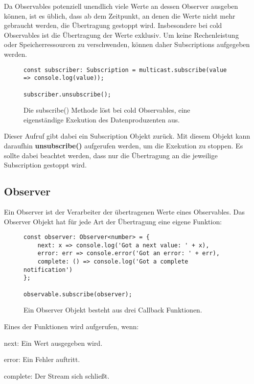 Da Observables potenziell unendlich viele Werte an dessen Observer ausgeben können, ist es üblich, dass ab dem Zeitpunkt, an denen die Werte nicht mehr gebraucht werden, die Übertragung gestoppt wird. Insbesondere bei cold Observables ist die Übertragung der Werte exklusiv. Um keine Rechenleistung oder Speicherressourcen zu verschwenden, können daher Subscriptions aufgegeben werden.

\begin{figure}[H]
\begin{lstlisting}[basicstyle=\small]
const subscriber: Subscription = multicast.subscribe(value => console.log(value));

subscriber.unsubscribe();
\end{lstlisting}

\caption{Die subscribe() Methode löst bei cold Observables, eine eigenständige  Exekution des Datenproduzenten aus.}
\end{figure}

\noindent
Dieser Aufruf gibt dabei ein Subscription Objekt zurück. Mit diesem Objekt kann daraufhin \textbf{unsubscribe()} aufgerufen werden, um die Exekution zu stoppen. Es sollte dabei beachtet werden, dass nur die Übertragung an die jeweilige Subscription gestoppt wird.

\subsection{Observer}

Ein Observer ist der Verarbeiter der übertragenen Werte eines Observables. Das Observer Objekt hat für jede Art der Übertragung eine eigene Funktion:

\begin{figure}[H]
\begin{lstlisting}[basicstyle=\small]
const observer: Observer<number> = {
    next: x => console.log('Got a next value: ' + x),
    error: err => console.error('Got an error: ' + err),
    complete: () => console.log('Got a complete notification')
};

observable.subscribe(observer);
\end{lstlisting}
\caption{Ein Observer Objekt besteht aus drei Callback Funktionen.}
\end{figure}

\noindent
Eines der Funktionen wird aufgerufen, wenn:

\begin{description}
\item next: Ein Wert ausgegeben wird.
\item error: Ein Fehler auftritt.
\item complete: Der Stream sich schließt.
\end{description}

